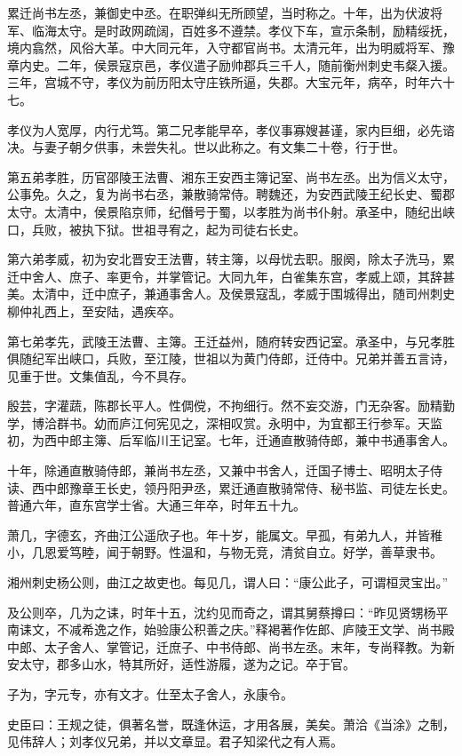 \documentclass[12pt,UTF8]{ctexbook}
\begin{document}
累迁尚书左丞，兼御史中丞。在职弹纠无所顾望，当时称之。十年，出为伏波将军、临海太守。是时政网疏阔，百姓多不遵禁。孝仪下车，宣示条制，励精绥抚，境内翕然，风俗大革。中大同元年，入守都官尚书。太清元年，出为明威将军、豫章内史。二年，侯景寇京邑，孝仪遣子励帅郡兵三千人，随前衡州刺史韦粲入援。三年，宫城不守，孝仪为前历阳太守庄铁所逼，失郡。大宝元年，病卒，时年六十七。

孝仪为人宽厚，内行尤笃。第二兄孝能早卒，孝仪事寡嫂甚谨，家内巨细，必先谘决。与妻子朝夕供事，未尝失礼。世以此称之。有文集二十卷，行于世。

第五弟孝胜，历官邵陵王法曹、湘东王安西主簿记室、尚书左丞。出为信义太守，公事免。久之，复为尚书右丞，兼散骑常侍。聘魏还，为安西武陵王纪长史、蜀郡太守。太清中，侯景陷京师，纪僭号于蜀，以孝胜为尚书仆射。承圣中，随纪出峡口，兵败，被执下狱。世祖寻宥之，起为司徒右长史。

第六弟孝威，初为安北晋安王法曹，转主簿，以母忧去职。服阕，除太子洗马，累迁中舍人、庶子、率更令，并掌管记。大同九年，白雀集东宫，孝威上颂，其辞甚美。太清中，迁中庶子，兼通事舍人。及侯景寇乱，孝威于围城得出，随司州刺史柳仲礼西上，至安陆，遇疾卒。

第七弟孝先，武陵王法曹、主簿。王迁益州，随府转安西记室。承圣中，与兄孝胜俱随纪军出峡口，兵败，至江陵，世祖以为黄门侍郎，迁侍中。兄弟并善五言诗，见重于世。文集值乱，今不具存。

殷芸，字灌蔬，陈郡长平人。性倜傥，不拘细行。然不妄交游，门无杂客。励精勤学，博洽群书。幼而庐江何宪见之，深相叹赏。永明中，为宜都王行参军。天监初，为西中郎主簿、后军临川王记室。七年，迁通直散骑侍郎，兼中书通事舍人。

十年，除通直散骑侍郎，兼尚书左丞，又兼中书舍人，迁国子博士、昭明太子侍读、西中郎豫章王长史，领丹阳尹丞，累迁通直散骑常侍、秘书监、司徒左长史。普通六年，直东宫学士省。大通三年卒，时年五十九。

萧几，字德玄，齐曲江公遥欣子也。年十岁，能属文。早孤，有弟九人，并皆稚小，几恩爱笃睦，闻于朝野。性温和，与物无竞，清贫自立。好学，善草隶书。

湘州刺史杨公则，曲江之故吏也。每见几，谓人曰：“康公此子，可谓桓灵宝出。”

及公则卒，几为之诔，时年十五，沈约见而奇之，谓其舅蔡撙曰：“昨见贤甥杨平南诔文，不减希逸之作，始验康公积善之庆。”释褐著作佐郎、庐陵王文学、尚书殿中郎、太子舍人、掌管记，迁庶子、中书侍郎、尚书左丞。末年，专尚释教。为新安太守，郡多山水，特其所好，适性游履，遂为之记。卒于官。

子为，字元专，亦有文才。仕至太子舍人，永康令。

史臣曰：王规之徒，俱著名誉，既逢休运，才用各展，美矣。萧洽《当涂》之制，见伟辞人；刘孝仪兄弟，并以文章显。君子知梁代之有人焉。
\end{document}
